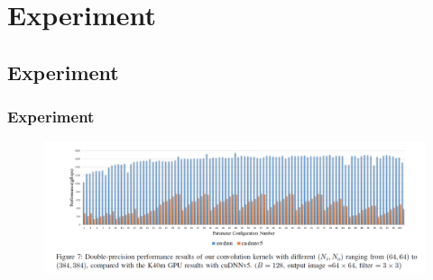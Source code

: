 \section{Experiment}


\subsection{Experiment}
\begin{frame}
	\frametitle{Experiment}
	\begin{figure}
		\includegraphics[scale=0.35]{figure/experiment.PNG}
	\end{figure}
\end{frame}



	

